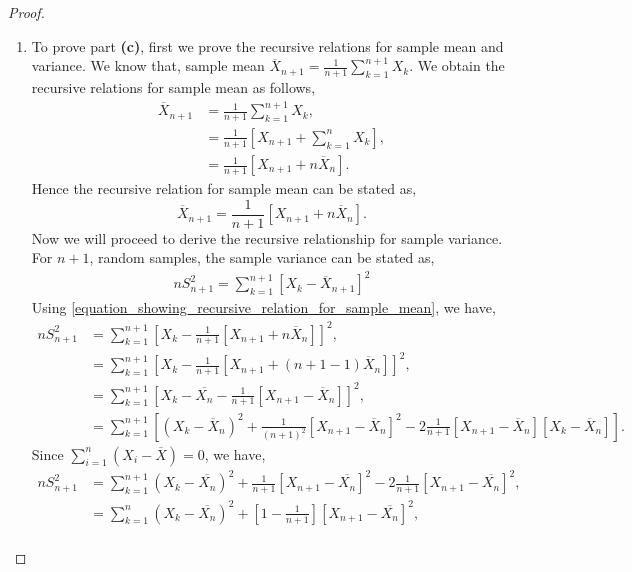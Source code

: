 \documentclass[a4paper,english,12pt]{article}
\begin{document}
\begin{proof}
\begin{enumerate}
\begin{lem}
\end{lem}
\item To prove part \textbf{(c)}, first we prove the recursive relations for sample mean and variance. We know that, sample mean $\overline{X}_{n+1}=\frac{1}{n+1} \sum\limits_{k=1}^{n+1} X_{k}$. We obtain the recursive relations for sample mean as follows,
\begin{align}
\overline{X}_{n+1}& =\frac{1}{n+1} \sum\limits_{k=1}^{n+1} X_{k}, \nonumber \\
& = \frac{1}{n+1} [X_{n+1} + \sum\limits_{k=1}^{n} X_{k}], \nonumber \\
& = \frac{1}{n+1} [X_{n+1} + n\overline{X}_n]. \nonumber 
\end{align}
Hence the recursive relation for sample mean can be stated as,
\begin{equation} \label{equation_showing_recursive_relation_for_sample_mean}
\overline{X}_{n+1}= \frac{1}{n+1} [X_{n+1} + n\overline{X}_n].
\end{equation}
Now we will proceed to derive the recursive relationship for sample variance.\\
For $n+1$, random samples, the sample variance can be stated as,
\begin{align}
nS_{n+1} ^2=\sum\limits_{k=1}^{n+1} [X_{k}-\overline{X}_{n+1}]^2
\end{align}
Using \eqref{equation_showing_recursive_relation_for_sample_mean}, we have,
\begin{align}
nS_{n+1} ^2& =\sum\limits_{k=1}^{n+1} [X_{k}-\frac{1}{n+1} [X_{n+1} + n\overline{X}_n]]^2 , \nonumber \\
& =\sum\limits_{k=1}^{n+1} [X_{k}-\frac{1}{n+1} [X_{n+1} + (n+1-1)\overline{X}_n]]^2 , \nonumber \\
& =\sum\limits_{k=1}^{n+1} [X_{k}-\overline{X_n}-\frac{1}{n+1}[X_{n+1} - \overline{X}_n]]^2 , \nonumber \\
& =\sum\limits_{k=1}^{n+1} [(X_{k}-\overline{X}_n)^2+\frac{1}{(n+1)^2}[X_{n+1} - \overline{X}_n]^2-2 \frac{1}{n+1}[X_{n+1} - \overline{X}_n][X_{k}-\overline{X}_n]].
\end{align}
Since $\sum_{i=1}^n(X_i-\overline{X})=0$, we have,
\begin{align}
nS_{n+1} ^2&=\sum\limits_{k=1}^{n+1} (X_{k}-\overline{X_n})^2+\frac{1}{n+1}[X_{n+1} - \overline{X_n}]^2-2 \frac{1}{n+1}[X_{n+1} - \overline{X_n}]^2 , \nonumber \\
& =\sum\limits_{k=1}^{n} (X_{k}-\overline{X_n})^2+\left[1-\frac{1}{n+1}\right][X_{n+1} - \overline{X_n}]^2 , \nonumber \\

\end{align}
\end{enumerate}
\end{proof}
\end{document}

